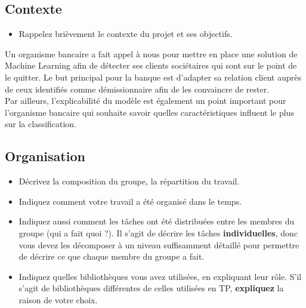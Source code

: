 \documentclass{ceri/sty/rapport}
\begin{document}
\subsection{Contexte}
\begin{itemize}
	\item Rappelez brièvement le contexte du projet et ses objectifs.
\end{itemize}

Un organisme bancaire a fait appel à nous pour mettre en place une solution de Machine Learning afin de détecter ses clients sociétaires qui sont sur le point de le quitter. Le but principal pour la banque est d'adapter sa relation client auprès de ceux identifiés comme démissionnaire afin de les convaincre de rester.\\

Par ailleurs, l'explicabilité du modèle est également un point important pour l'organisme bancaire qui souhaite savoir quelles caractéristiques influent le plus sur la classification.



\subsection{Organisation}
\begin{itemize}
	\item Décrivez la composition du groupe, la répartition du travail.
	\item Indiquez comment votre travail a été organisé dans le temps.
	\item Indiquez aussi comment les tâches ont été distribuées entre les membres du groupe (qui a fait quoi ?). Il s'agit de décrire les tâches \textbf{individuelles}, donc vous devez les décomposer à un niveau suffisamment détaillé pour permettre de décrire ce que chaque membre du groupe a fait.
	\item Indiquez quelles bibliothèques vous avez utilisées, en expliquant leur rôle. S'il s'agit de bibliothèques différentes de celles utilisées en TP, \textbf{expliquez} la raison de votre choix.
\end{itemize}
\end{document}
